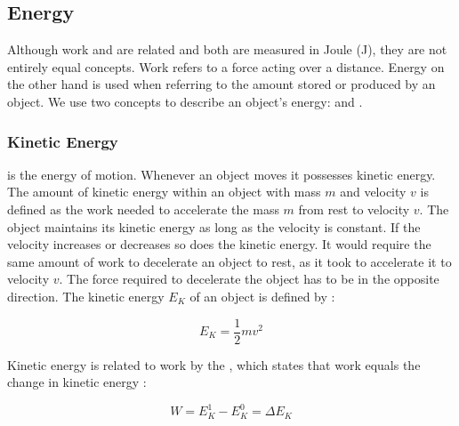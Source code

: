

\subsection{Energy}
Although work and  are related and both are measured in
Joule (J), they are not entirely equal concepts. Work refers to a force
acting over a distance. Energy on the other hand is
used when referring to the amount stored or produced by an
object. We use two concepts to describe an object's energy:  and . 

\subsubsection{Kinetic Energy}
 is the energy of motion. Whenever an object moves it
possesses kinetic energy. The amount of kinetic energy within an object
with mass $m$ and velocity $v$ is defined as the work needed to
accelerate the mass $m$ from rest to velocity $v$. The object maintains
its kinetic energy as long as the velocity is constant. If the
velocity increases or decreases so does the kinetic energy. It would
require the same amount of work to decelerate an object to rest, as it
took to accelerate it to velocity $v$. The force required to
decelerate the object has to be in the opposite
direction. The kinetic energy $E_K$ of an object is defined by
:

\begin{equation}
E_K = \frac{1}{2} m v^2
\end{equation}

Kinetic energy is related to work by the ,
which states that work equals the change in kinetic energy
:

\begin{equation}
W = E_K^1 - E_K^0 = \Delta E_K
\end{equation}

